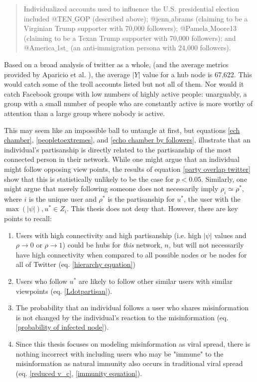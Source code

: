\documentclass[preprint,review,12pt]{elsarticle}
\begin{document}
\begin{quote}
Individualized accounts used to influence the U.S. presidential election included @TEN$\_$GOP (described above); @jenn$\_$abrams (claiming to be a Virginian Trump supporter with 70,000 followers); @Pamela$\_$Moore13 (claiming to be a Texan Trump supporter with 70,000
followers); and @America$\_$1st$\_$ (an anti-immigration persona with 24,000 followers). \cite{mueller2019mueller}
\end{quote}

Based on a broad analysis of twitter as a whole, (and the average metrics provided by Aparicio et al. \cite{aparicio2015model}), the average $|Y|$ value for a hub node is 67,622. This would catch some of the troll accounts listed but not all of them. Nor would it catch Facebook groups with low numbers of highly active people: unarguably, a group with a small number of people who are constantly active is more worthy of attention than a large group where nobody is active.

This may seem like an impossible ball to untangle at first, but equations \ref{ech chamber}, \ref{peopletoextremes}, and \ref{echo chamber by followers}, illustrate that an individual's partisanship is directly related to the partisanship of the most connected person in their network. While one might argue that an individual might follow opposing view points, the results of equation \ref{party overlap twitter} show that this is statistically unlikely to be the case for $p < 0.05$. Similarly, one might argue that merely following someone does not necessarily imply $\rho_i \simeq \rho^*$, where $i$ is the unique user and $\rho^*$ is the partisanship for $u^*$, the user with the $\max(|\psi|), u^* \in Z_i$. This thesis does not deny that. However, there are key points to recall:
\begin{enumerate}
    \item Users with high connectivity and high partisanship (i.e. high $|\psi|$ values and $\rho \rightarrow 0$ or $\rho \rightarrow 1$) could be hubs for \textit{this} network, $n$, but will not necessarily have high connectivity when compared to all possible nodes or be nodes for all of Twitter (eq. \ref{hierarchy equation}) 
    \item Users who follow $u^*$ are likely to follow other similar users with similar viewpoints (eq. \ref{Ldotpartisan}).
    \item The probability that an individual follows a user who shares misinformation is not changed by the individual's reaction to the misinformation (eq. \ref{probability of infected node}).
    \item Since this thesis focuses on modeling misinformation as viral spread, there is nothing incorrect with including users who may be "immune" to the misinformation as natural immunity also occurs in traditional viral spread (eq. \ref{reduced v_c}, \ref{immunity equation}).
\end{enumerate}
\end{document}
